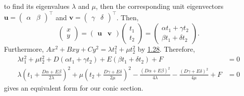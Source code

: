 \documentclass[../Notes.tex]{subfiles}
\begin{document}
to find its eigenvalues \(\lambda\) and \(\mu\), then the corresponding unit eigenvectors \(\mathbf{u}=
\begin{pmatrix}
    \alpha & \beta
\end{pmatrix}^\top\) and \(\mathbf{v}=
\begin{pmatrix}
    \gamma & \delta
\end{pmatrix}^\top\). Then,
\[\begin{pmatrix}
    x\\
    y
\end{pmatrix}=
\begin{pmatrix}
    \mathbf{u} & \mathbf{v}
\end{pmatrix}
\begin{pmatrix}
    t_1\\
    t_2
\end{pmatrix}=
\begin{pmatrix}
    \alpha t_1+\gamma t_2\\
    \beta t_1+\delta t_2
\end{pmatrix}.\]
Furthermore, \(Ax^2+Bxy+Cy^2=\lambda t_1^2+\mu t_2^2\) by \hyperlink{thm:quadratic-forms-real}{1.28}. Therefore, 
\begin{align*}
    \lambda t_1^2+\mu t_2^2+D(\alpha t_1+\gamma t_2)+E(\beta t_1+\delta t_2)+F&=0\\
    \lambda\left( t_1+\frac{D\alpha+E\beta}{2\lambda} \right)^2+\mu\left( t_2+\frac{D\gamma+E\delta}{2\mu} \right)^2-\frac{(D\alpha+E\beta)^2}{4\lambda}-\frac{(D\gamma+E\delta)^2}{4\mu}+F&=0
\end{align*}
gives an equivalent form for our conic section. 
\end{document}
